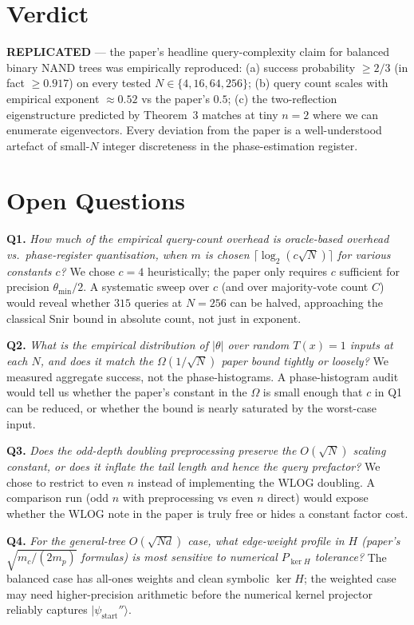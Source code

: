 \documentclass[11pt]{article}
\begin{document}
\section{Verdict}

\textbf{REPLICATED} --- the paper's headline query-complexity claim for balanced binary NAND trees
was empirically reproduced: (a) success probability $\ge 2/3$ (in fact $\ge 0.917$) on every tested
$N \in \{4,16,64,256\}$; (b) query count scales with empirical exponent $\approx 0.52$ vs the
paper's $0.5$; (c) the two-reflection eigenstructure predicted by Theorem~3 matches at
tiny $n=2$ where we can enumerate eigenvectors. Every deviation from the paper is a
well-understood artefact of small-$N$ integer discreteness in the phase-estimation register.

\section{Open Questions}

\textbf{Q1.} \emph{How much of the empirical query-count overhead is oracle-based
overhead vs.\ phase-register quantisation, when $m$ is chosen $\lceil \log_2(c\sqrt N)\rceil$
for various constants $c$?} We chose $c=4$ heuristically; the paper only requires $c$
sufficient for precision $\theta_{\min}/2$. A systematic sweep over $c$ (and over
majority-vote count $C$) would reveal whether $315$ queries at $N=256$ can be halved,
approaching the classical Snir bound in absolute count, not just in exponent.

\textbf{Q2.} \emph{What is the empirical distribution of $|\theta|$ over random $T(x)=1$
inputs at each $N$, and does it match the $\Omega(1/\sqrt N)$ paper bound tightly or loosely?}
We measured aggregate success, not the phase-histograms. A phase-histogram audit would
tell us whether the paper's constant in the $\Omega$ is small enough that $c$ in Q1
can be reduced, or whether the bound is nearly saturated by the worst-case input.

\textbf{Q3.} \emph{Does the odd-depth doubling preprocessing preserve the $O(\sqrt N)$ scaling
constant, or does it inflate the tail length and hence the query prefactor?} We chose to
restrict to even $n$ instead of implementing the WLOG doubling. A comparison run (odd $n$
with preprocessing vs even $n$ direct) would expose whether the WLOG note in the paper
is truly free or hides a constant factor cost.

\textbf{Q4.} \emph{For the general-tree $O(\sqrt{Nd})$ case, what edge-weight profile
in $H$ (paper's $\sqrt{m_c/(2 m_p)}$ formulas) is most sensitive to numerical
$P_{\ker H}$ tolerance?} The balanced case has all-ones weights and clean symbolic $\ker H$;
the weighted case may need higher-precision arithmetic before the numerical kernel
projector reliably captures $|\psi_{\text{start}}''\rangle$.
\end{document}
